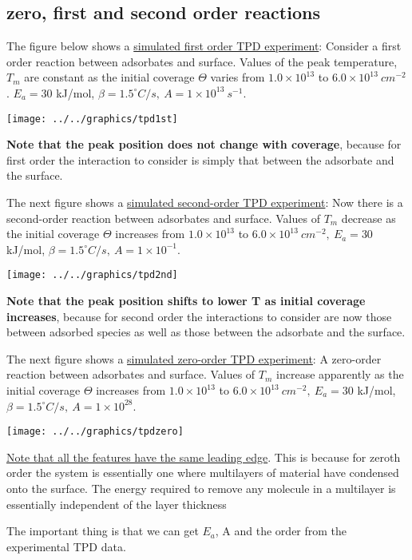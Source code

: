 \documentclass[ignorenonframetext]{beamer}
\begin{document}
\subsection{zero, first and second order reactions}

The figure below shows a \underline{simulated first order TPD experiment}: Consider a first order reaction between adsorbates and surface. Values of the peak temperature, \(T_m\) are constant as the initial coverage \(\Theta\) varies from \(1.0 \times 10^{13}\) to \(6.0 \times 10^{13}\ cm^{-2}\). \(E_a = 30\) kJ/mol, \(\beta = 1.5^\circ C/s,\ A = 1 \times 10^{13}\ s^{-1}\). 

\texttt{[image: ../../graphics/tpd1st]}

\textbf{Note that the peak position does not change with coverage}, because for first order the interaction to consider is simply that between the adsorbate and the surface.

The next figure shows a \underline{simulated second-order TPD experiment}: Now there is a second-order reaction between adsorbates and surface. Values of \(T_m\) decrease as the initial coverage \(\Theta\) increases from \(1.0 \times 10^{13}\) to \(6.0 \times 10^{13}\ cm^{-2},\ E_a = 30\) kJ/mol, \(\beta = 1.5^\circ C/s,\ A = 1 \times 10^{-1}\).

\texttt{[image: ../../graphics/tpd2nd]}

\textbf{Note that the peak position shifts to lower T as initial coverage increases}, because for second order the interactions to consider are now those between adsorbed species as well as those between the adsorbate and the surface.

The next figure shows a \underline{simulated zero-order TPD experiment}: A zero-order reaction between adsorbates and surface. Values of \(T_m\) increase apparently as the initial coverage \(\Theta\) increases from \(1.0 \times 10^{13}\) to \(6.0 \times 10^{13}\ cm^{-2},\ E_a = 30\) kJ/mol, \(\beta = 1.5^\circ C/s,\ A = 1 \times 10^{28}\).

\texttt{[image: ../../graphics/tpdzero]}

\underline{Note that all the features have the same leading edge}. This is because for zeroth order the system is essentially one where multilayers of material have condensed onto the surface. The energy required to remove any molecule in a multilayer is essentially independent of the layer thickness

\medskip The important thing is that we can get \(E_a\), A and the order from the experimental TPD data.
\end{document}
